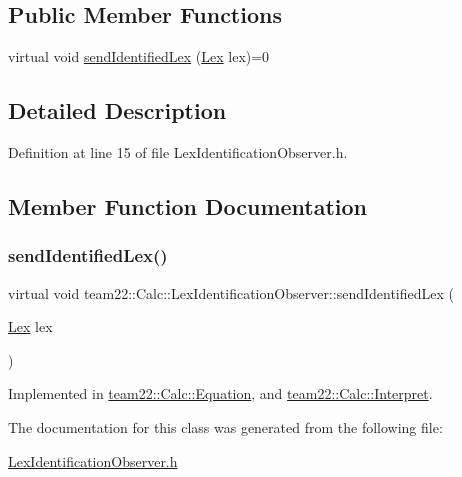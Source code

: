 \subsection*{Public Member Functions}
\begin{DoxyCompactItemize}
\item 
virtual void \hyperlink{classteam22_1_1_calc_1_1_lex_identification_observer_ac139f75c560625ec6fdb2e34cf0d4884}{send\+Identified\+Lex} (\hyperlink{classteam22_1_1_calc_1_1_lex}{Lex} lex)=0
\end{DoxyCompactItemize}


\subsection{Detailed Description}


Definition at line 15 of file Lex\+Identification\+Observer.\+h.



\subsection{Member Function Documentation}
\mbox{\label{classteam22_1_1_calc_1_1_lex_identification_observer_ac139f75c560625ec6fdb2e34cf0d4884}} 
\subsubsection{\texorpdfstring{send\+Identified\+Lex()}{sendIdentifiedLex()}}
{\footnotesize\ttfamily virtual void team22\+::\+Calc\+::\+Lex\+Identification\+Observer\+::send\+Identified\+Lex (\begin{DoxyParamCaption}\item[{\hyperlink{classteam22_1_1_calc_1_1_lex}{Lex}}]{lex }\end{DoxyParamCaption})\hspace{0.3cm}{\ttfamily [pure virtual]}}



Implemented in \hyperlink{classteam22_1_1_calc_1_1_equation_ad5768951865500ec7fc514f676de2851}{team22\+::\+Calc\+::\+Equation}, and \hyperlink{classteam22_1_1_calc_1_1_interpret_a479c65c010f4ef1060049b684e5f7eb6}{team22\+::\+Calc\+::\+Interpret}.



The documentation for this class was generated from the following file\+:\begin{DoxyCompactItemize}
\item 
\hyperlink{_lex_identification_observer_8h}{Lex\+Identification\+Observer.\+h}\end{DoxyCompactItemize}

